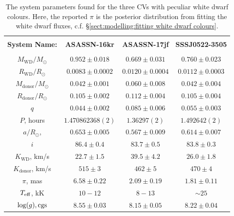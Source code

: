 \begin{table}
    \centering
    \caption{The system parameters found for the three CVs with peculiar white dwarf colours. Here, the reported $\pi$ is the posterior distribution from fitting the white dwarf fluxes, c.f. \S\ref{sect:modelling:fitting white dwarf colours}.}
    \label{table:three white dwarfs:system_parameters main}
    \begin{tabular}{cccc}
        \hline \\
        \textbf{System Name:}      & \textbf{ASASSN-16kr}    & \textbf{ASASSN-17jf}  & \textbf{SSSJ0522-3505} \\
        \hline \hline \\
        $M_\mathrm{WD}/M_\odot$    & $0.952\pm0.018$         & $0.669\pm0.031$        & $0.760\pm0.023$ \\
        $R_\mathrm{WD}/R_\odot$    & $0.0083\pm0.0002$       & $0.0120\pm0.0004$      & $0.0112\pm0.0003$ \\
        $M_\mathrm{donor}/M_\odot$ & $0.042\pm0.001$         & $0.060\pm0.008$        & $0.042\pm0.004$ \\
        $R_\mathrm{donor}/R_\odot$ & $0.105\pm0.002$         & $0.112\pm0.004$        & $0.105\pm0.004$ \\
        $q$                        & $0.044\pm0.002$         & $0.085\pm0.006$        & $0.055\pm0.003$ \\
        \hline
        $P$, hours                 & $1.470862368(2)$        & $1.36297(2)$           & $1.492642(2)$ \\
        $a/R_\odot$,               & $0.653\pm0.005$         & $0.567\pm0.009$        & $0.614\pm0.007$  \\
        $i$                        & $86.4\pm0.4$            & $83.7\pm0.5$           & $83.8\pm0.3$  \\
        $K_\mathrm{WD}$, km/s      & $22.7\pm1.5$            & $39.5\pm4.2$           & $26.0\pm1.8$  \\
        $K_\mathrm{donor}$, km/s   & $515\pm3$               & $462\pm5$              & $470\pm4$  \\
        \hline
        $\pi$, mas                 & $6.58\pm0.22$           & $2.09\pm0.19$          & $1.81\pm0.11$  \\
        $T_{\rm eff}$, kK          & $10-12$                 & $8-13$                 & $\sim25$  \\
        $\log(g), {\rm cgs}$       & $8.55\pm0.03$           & $8.15\pm0.05$          & $8.22\pm0.04$  \\
        \hline
    \end{tabular}
\end{table}


